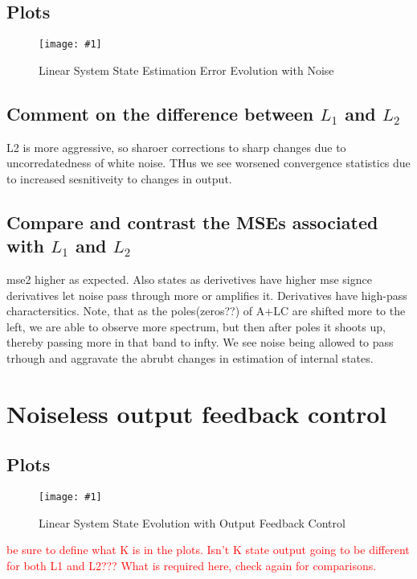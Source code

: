 \documentclass[10pt]{article}
\newcommand{\shrinkimage}[1]{\texttt{[image: \#1]}}
\begin{document}
\subsection{Plots}
\begin{figure}[h!]
    \centering
    \shrinkimage{lin_noisy_state_est_error.pdf}
    \caption{Linear System State Estimation Error Evolution with Noise}
    \label{fig:lin_noisy_state_est_error}
\end{figure}

\subsection{Comment on the difference between \texorpdfstring{$L_1$}{L1} and \texorpdfstring{$L_2$}{L2}}
L2 is more aggressive, so sharoer corrections to sharp changes due to uncorredatedness of white noise. THus we see worsened convergence statistics due to increased sesnitiveity to changes in output.

\subsection{Compare and contrast the MSEs associated with \texorpdfstring{$L_1$}{L1} and \texorpdfstring{$L_2$}{L2}}
mse2 higher as expected. Also states as derivetives have higher mse signce derivatives let noise pass through more or amplifies it. Derivatives have high-pass charactersitics.
Note, that as the poles(zeros??) of A+LC are shifted more to the left, we are able to observe more spectrum, but then after poles it shoots up, thereby passing more in that band to infty. We see noise being allowed to pass trhough and aggravate the abrubt changes in estimation of internal states.

\section{Noiseless output feedback control} 

\subsection{Plots}
\begin{figure}[h]
    \centering
    \shrinkimage{lab4/figs/lin_noiseless_state_est_error_feedback.pdf}
    \caption{Linear System State Evolution with Output Feedback Control}
    \label{fig:lin_noiseless_state_est_error_feedback}
\end{figure}

\textcolor{red}{be sure to define what K is in the plots. Isn't K state output going to be different for both L1 and L2??? What is required here, check again for comparisons.}
\end{document}
